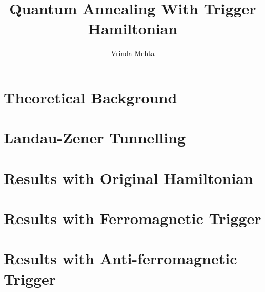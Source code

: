 \documentclass[12]{book}
\title{Quantum Annealing With Trigger Hamiltonian}
\author{Vrinda Mehta}
\date{}
\begin{document}
 
\maketitle
 
\chapter{Theoretical Background}
 

 
\chapter{Landau-Zener Tunnelling}
 

 
\chapter{Results with Original Hamiltonian}
 

 
\chapter{Results with Ferromagnetic Trigger}
 


\chapter{Results with Anti-ferromagnetic Trigger}
 

\end{document}
